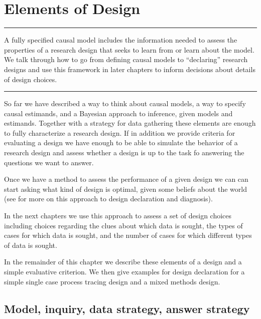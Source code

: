 \documentclass[
  12pt,
]{book}
\begin{document}
\hypertarget{elements-of-design}{%
\chapter{Elements of Design}\label{elements-of-design}}

\begin{center}\rule{0.5\linewidth}{0.5pt}\end{center}

A fully specified causal model includes the information needed to assess the properties of a research design that seeks to learn from or learn about the model. We talk through how to go from defining causal models to ``declaring'' research designs and use this framework in later chapters to inform decisions about details of design choices.

\begin{center}\rule{0.5\linewidth}{0.5pt}\end{center}

So far we have described a way to think about causal models, a way to specify causal estimands, and a Bayesian approach to inference, given models and estimands. Together with a strategy for data gathering these elements are enough to fully characterize a research design. If in addition we provide criteria for evaluating a design we have enough to be able to simulate the behavior of a research design and assess whether a design is up to the task fo answering the questions we want to answer.

Once we have a method to assess the performance of a given design we can can start asking what kind of design is optimal, given some beliefs about the world (see \citet{blair2016declaring} for more on this approach to design declaration and diagnosis).

In the next chapters we use this approach to assess a set of design choices including choices regarding the clues about which data is sought, the types of cases for which data is sought, and the number of cases for which different types of data is sought.

In the remainder of this chapter we describe these elements of a design and a simple evaluative criterion. We then give examples for design declaration for a simple single case process tracing design and a mixed methods design.

\hypertarget{model-inquiry-data-strategy-answer-strategy}{%
\section{Model, inquiry, data strategy, answer strategy}\label{model-inquiry-data-strategy-answer-strategy}}
\end{document}
